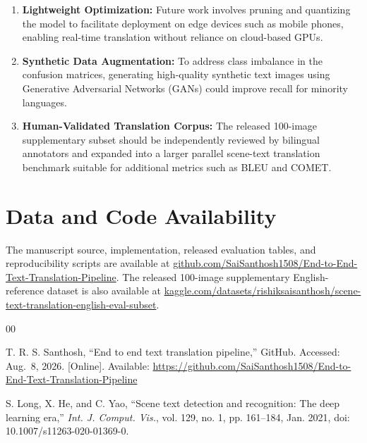 \documentclass{ieeeaccess}
\begin{document}
{\begin{enumerate}
  \item \textbf{Lightweight Optimization:} Future work involves pruning and quantizing the model to facilitate deployment on edge devices such as mobile phones, enabling real-time translation without reliance on cloud-based GPUs.

  \item \textbf{Synthetic Data Augmentation:} To address class imbalance in the confusion matrices, generating high-quality synthetic text images using Generative Adversarial Networks (GANs) could improve recall for minority languages.

  \item \textbf{Human-Validated Translation Corpus:} The released 100-image supplementary subset should be independently reviewed by bilingual annotators and expanded into a larger parallel scene-text translation benchmark suitable for additional metrics such as BLEU and COMET.
\end{enumerate}

\section*{Data and Code Availability}

The manuscript source, implementation, released evaluation tables, and
reproducibility scripts are available at
\href{https://github.com/SaiSanthosh1508/End-to-End-Text-Translation-Pipeline}{github.com/SaiSanthosh1508/End-to-End-Text-Translation-Pipeline}.
The released 100-image supplementary English-reference dataset is also
available at
\href{https://www.kaggle.com/datasets/rishiksaisanthosh/scene-text-translation-english-eval-subset}{kaggle.com/datasets/rishiksaisanthosh/scene-text-translation-english-eval-subset}.

\begin{thebibliography}{00}

 T. R. S. Santhosh, ``End to end text translation pipeline,''
  GitHub. Accessed: Aug.~8, 2026. [Online]. Available:
  \url{https://github.com/SaiSanthosh1508/End-to-End-Text-Translation-Pipeline}

 S. Long, X. He, and C. Yao, ``Scene text detection and recognition:
  The deep learning era,'' \textit{Int. J. Comput. Vis.}, vol. 129, no. 1,
  pp. 161--184, Jan. 2021, doi: 10.1007/s11263-020-01369-0.


\end{thebibliography}}
\end{document}
